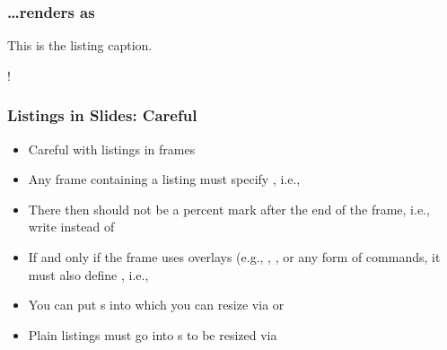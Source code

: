 \documentclass[mathserif]{beamer}%
\begin{document}
%
\begin{frame}[containsverbatim]%
\frametitle{{\dots}renders as}%
\begin{center}%
\begin{listingBlock}[0.8]{This is the listing caption.}%
\begin{scaledBox}{0.8\paperwidth}{!}%
\parbox{1.5\paperwidth}{%
%
}%
\end{scaledBox}%
\end{listingBlock}%
\end{center}%
\end{frame}%
%
\begin{frame}%
\frametitle{Listings in Slides: Careful}%
\begin{itemize}%
\item Careful with listings in frames%
\item<2-> Any frame containing a listing must specify \codeil{[containsverbatim]}, i.e., %
\item<3-> There then should not be a percent mark after the end of the frame, i.e., write  instead of 
\item<4-> If and only if the frame uses overlays (e.g., , , or any \codeBox{\texttt{<>}} form of commands, it must also define , i.e.,  %
\item<5-> You can put s into  which you can resize via  or %
\item<6-> Plain listings  must go into s to be resized via %
\end{itemize}%
\end{frame}%
%
\end{document}
